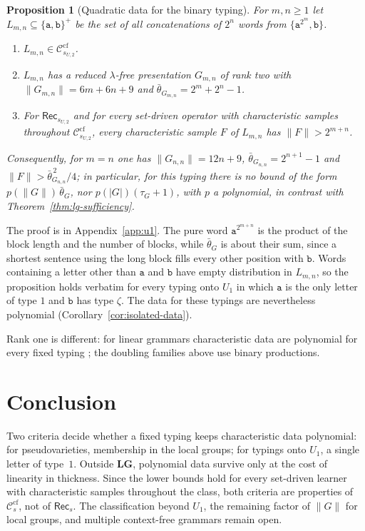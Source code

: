 \documentclass[11pt]{article}
\numberwithin{equation}{section}
\theoremstyle{plain}
\newtheorem{proposition}[theorem]{Proposition}
\theoremstyle{definition}
\theoremstyle{remark}
\theoremstyle{plain}
\newcommand{\cf}{\mathrm{cf}}
\newcommand{\Ccf}[1]{\mathcal C_{#1}^{\cf}}
\newcommand{\Rec}{\mathsf{Rec}}
\newcommand{\LG}{\mathbf{LG}}
\begin{document}
\begin{proposition}[Quadratic data for the binary typing]
\label{prop:binary-quadratic}
For $m,n\ge1$ let $L_{m,n}\subseteq\{\mathtt a,\mathtt b\}^+$ be the set of all
concatenations of $2^n$ words from $\{\mathtt a^{2^m},\mathtt b\}$.
\begin{enumerate}[label=\textup{(\roman*)},leftmargin=*]
\item $L_{m,n}\in\Ccf{s_{U,2}}$.
\item $L_{m,n}$ has a reduced $\lambda$-free presentation $G_{m,n}$ of rank two with $\|G_{m,n}\|=6m+6n+9$ and $\bar\theta_{G_{m,n}}=2^m+2^n-1$.
\item For $\Rec_{s_{U,2}}$ and for every set-driven operator with characteristic
samples throughout $\Ccf{s_{U,2}}$, every characteristic sample $F$ of $L_{m,n}$
has $\|F\|>2^{m+n}$.
\end{enumerate}
Consequently, for $m=n$ one has $\|G_{n,n}\|=12n+9$, $\bar\theta_{G_{n,n}}=2^{n+1}-1$
and $\|F\|>\bar\theta_{G_{n,n}}^{\,2}/4$; in particular, for this typing there is
no bound of the form $p(\|G\|)\,\bar\theta_G$, nor $p(|G|)(\tau_G+1)$, with $p$ a
polynomial, in contrast with Theorem~\ref{thm:lg-sufficiency}.
\end{proposition}

The proof is in Appendix~\ref{app:u1}.  The pure word
$\mathtt a^{2^{m+n}}$ is the product of the block length and the number of
blocks, while $\bar\theta_G$ is about their sum, since a shortest sentence using
the long block fills every other position with $\mathtt b$.  Words containing a
letter other than $\mathtt a$ and $\mathtt b$ have empty distribution in
$L_{m,n}$, so the proposition holds verbatim for every typing onto $U_1$ in
which $\mathtt a$ is the only letter of type $1$ and $\mathtt b$ has type $\zeta$.
The data for these typings are nevertheless polynomial
(Corollary~\ref{cor:isolated-data}).

Rank one is different: for linear grammars characteristic data are polynomial
for every fixed typing \cite[Section~8]{kuriyamaCFG}; the doubling families
above use binary productions.

\section{Conclusion}
\label{sec:conclusion}
Two criteria decide whether a fixed typing keeps characteristic data
polynomial: for pseudovarieties, membership in the local groups; for typings
onto $U_1$, a single letter of type~$1$.  Outside $\LG$, polynomial data
survive only at the cost of linearity in thickness.  Since the lower bounds
hold for every set-driven learner with characteristic samples throughout the
class, both criteria are properties of $\Ccf{s}$, not of $\Rec_s$.  The
classification beyond $U_1$, the remaining factor of $\|G\|$ for local
groups, and multiple context-free grammars remain open.
\end{document}
